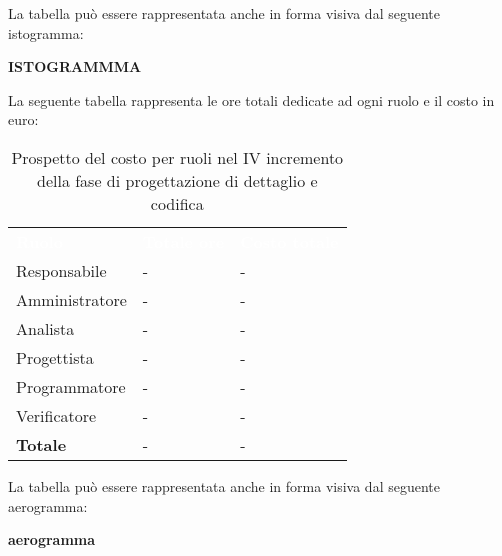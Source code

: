 La tabella può essere rappresentata anche in forma visiva dal seguente istogramma:

\textbf{ISTOGRAMMMA}


La seguente tabella rappresenta le ore totali dedicate ad ogni ruolo e il costo in euro:

\begin{table}[!htbp]
\begin{center}
\renewcommand{\arraystretch}{1.5}
\begin{tabular}{ m{}<{\centering}  m{}<{\centering} m{}<{\centering}}
	\rowcolor{darkblue}
	\textcolor{white}{\textbf{Ruolo}}&\textcolor{white}{\textbf{Totale ore}}&\textcolor{white}{\textbf{Costo totale}}\\ 

	Responsabile  & - & - \\	

	\rowcolor{gray!10} Amministratore & - & - \\
	
	Analista & - & - \\
	
	\rowcolor{gray!10} Progettista & - & - \\
	
	Programmatore & - & - \\
	
	\rowcolor{gray!10} Verificatore & - & - \\
	
	\textbf{Totale} & - & - \\
	
\end{tabular}
\caption{Prospetto del costo per ruoli nel IV incremento della fase di progettazione di dettaglio e codifica}
\end{center}
\end{table}

La tabella può essere rappresentata anche in forma visiva dal seguente aerogramma:

\textbf{aerogramma}


